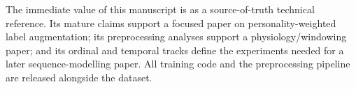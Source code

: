 \documentclass[sigconf,review,anonymous]{acmart}
\begin{document}
The immediate value of this manuscript is as a source-of-truth technical
reference.
Its mature claims support a focused paper on personality-weighted label
augmentation; its preprocessing analyses support a physiology/windowing paper;
and its ordinal and temporal tracks define the experiments needed for a later
sequence-modelling paper.
All training code and the preprocessing pipeline are released alongside the
dataset.




\end{document}
